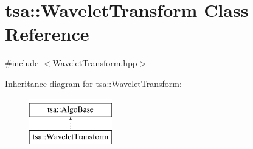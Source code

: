 \hypertarget{classtsa_1_1_wavelet_transform}{}\section{tsa\+:\+:Wavelet\+Transform Class Reference}
\label{classtsa_1_1_wavelet_transform}


{\ttfamily \#include $<$Wavelet\+Transform.\+hpp$>$}

Inheritance diagram for tsa\+:\+:Wavelet\+Transform\+:\begin{figure}[H]
\begin{center}
\leavevmode
\includegraphics[height=2.000000cm]{classtsa_1_1_wavelet_transform}
\end{center}
\end{figure}
